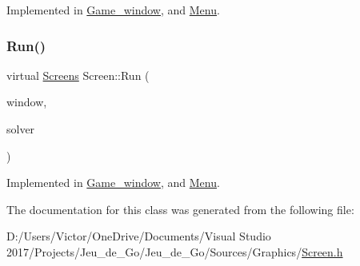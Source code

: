 Implemented in \hyperlink{class_game__window_aafdea9d00265261abfac6ad233b54638}{Game\+\_\+window}, and \hyperlink{class_menu_a7bc75c51f0ae43faeb694b8a0c4c7d16}{Menu}.

\mbox{\label{class_screen_abbb6a9b3d8fdc44620080e54d090e8c7}} 
\subsubsection{\texorpdfstring{Run()}{Run()}}
{\footnotesize\ttfamily virtual \hyperlink{_globals_8h_a3d5776bab98402b03be09156bacf4f68}{Screens} Screen\+::\+Run (\begin{DoxyParamCaption}\item[{sf\+::\+Render\+Window \&}]{window,  }\item[{\hyperlink{class_go___solver}{Go\+\_\+\+Solver} \&}]{solver }\end{DoxyParamCaption})\hspace{0.3cm}{\ttfamily [pure virtual]}}



Implemented in \hyperlink{class_game__window_a555769f4e8511e45d6623658dc736be5}{Game\+\_\+window}, and \hyperlink{class_menu_ac72037385d58cb1c814d7702c79e93f5}{Menu}.



The documentation for this class was generated from the following file\+:\begin{DoxyCompactItemize}
\item 
D\+:/\+Users/\+Victor/\+One\+Drive/\+Documents/\+Visual Studio 2017/\+Projects/\+Jeu\+\_\+de\+\_\+\+Go/\+Jeu\+\_\+de\+\_\+\+Go/\+Sources/\+Graphics/\hyperlink{_screen_8h}{Screen.\+h}\end{DoxyCompactItemize}
